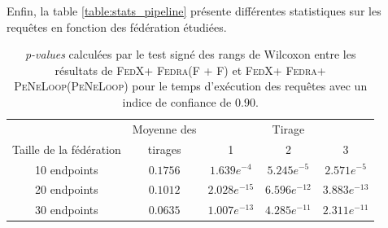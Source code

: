 \documentclass[a4paper]{article}
\def\fedra{\textsc{Fedra}\xspace}
\def\fedx{\textsc{FedX}\xspace}
\def\peneloop{\textsc{PeNeLoop}\xspace}
\begin{document}
Enfin, la table \ref{table:stats_pipeline} présente différentes statistiques sur les requêtes en fonction des fédération étudiées.

\begin{table}[t]
    \centering
    \begin{tabular}{|c|c|c|c|c|}
        \cline{2-5}
        \multicolumn{1}{c|}{ } & Moyenne des &  \multicolumn{3}{c|}{Tirage} \\
        \cline{1-1}\cline{3-5}
        Taille de la fédération & tirages & 1 & 2 & 3 \\
        \hline
        10 endpoints & $0.1756$ & $1.639e^{-4}$ & $5.245e^{-5}$ & $2.571e^{-5}$ \\
        \hline
        20 endpoints & $0.1012$ & $2.028e^{-15}$ & $6.596e^{-12}$ & $3.883e^{-13}$ \\
        \hline
        30 endpoints & $0.0635$ & $1.007e^{-13}$ & $4.285e^{-11}$ & $2.311e^{-11}$ \\
        \hline
    \end{tabular}
    \caption{\textit{p-values} calculées par le test signé des rangs de Wilcoxon entre les résultats de \fedx + \fedra (F + F) et \fedx + \fedra + \peneloop (\peneloop) pour le temps d'exécution des requêtes avec un indice de confiance de $0.90$.}
    \label{table:wilcoxon}
\end{table}
\end{document}
